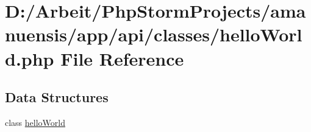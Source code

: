 \hypertarget{a00060}{}\section{D\+:/\+Arbeit/\+Php\+Storm\+Projects/amanuensis/app/api/classes/hello\+World.php File Reference}
\label{a00060}
\subsection*{Data Structures}
\begin{DoxyCompactItemize}
\item 
class \hyperlink{a00024}{hello\+World}
\end{DoxyCompactItemize}
